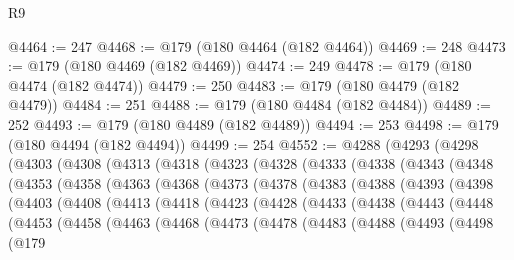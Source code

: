 \begin{lexlean}{R9}
\begin{coremodule}
{{{{{{{{{{{{{{{{{{{{{{{{{{{{{{{{{{{{{{{{{{{{{{{{{{{{{{{{{{{{{{{{{{{{{{{{{{{{{{{{{{{{@4464 := 247
@4468 := @179 (@180 @4464 (@182 @4464))
@4469 := 248
@4473 := @179 (@180 @4469 (@182 @4469))
@4474 := 249
@4478 := @179 (@180 @4474 (@182 @4474))
@4479 := 250
@4483 := @179 (@180 @4479 (@182 @4479))
@4484 := 251
@4488 := @179 (@180 @4484 (@182 @4484))
@4489 := 252
@4493 := @179 (@180 @4489 (@182 @4489))
@4494 := 253
@4498 := @179 (@180 @4494 (@182 @4494))
@4499 := 254
@4552 := @4288
    (@4293
      (@4298
        (@4303
          (@4308
            (@4313
              (@4318
                (@4323
                  (@4328
                    (@4333
                      (@4338
                        (@4343
                          (@4348
                            (@4353
                              (@4358
                                (@4363
                                  (@4368
                                    (@4373
                                      (@4378
                                        (@4383
                                          (@4388
                                            (@4393
                                              (@4398
                                                (@4403
                                                  (@4408
                                                    (@4413
                                                      (@4418
                                                        (@4423
                                                          (@4428
                                                            (@4433
                                                              (@4438
                                                                (@4443
                                                                  (@4448
                                                                    (@4453
                                                                      (@4458
                                                                        (@4463
                                                                          (@4468
                                                                            (@4473
                                                                              (@4478
                                                                                (@4483
                                                                                  (@4488
                                                                                    (@4493
                                                                                      (@4498
                                                                                        (@179
}}}}}}}}}}}}}}}}}}}}}}}}}}}}}}}}}}}}}}}}}}}}}}}}}}}}}}}}}}}}}}}}}}}}}}}}}}}}}}}}}}}}
\end{coremodule}
\end{lexlean}
